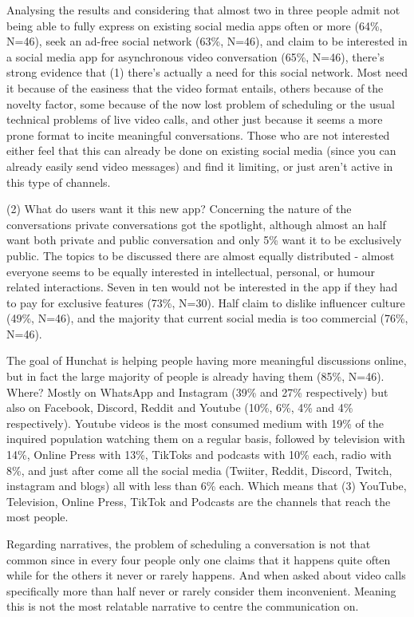 \documentclass[12pt]{article}
\begin{document}
Analysing the results and considering that almost two in three people admit not being able to fully express on existing social media apps often or more (64\%, N=46), seek an ad-free social network (63\%, N=46), and claim to be interested in a social media app for asynchronous video conversation (65\%, N=46), there's strong evidence that (1) there's actually a need for this social network. Most need it because of the easiness that the video format entails, others because of the novelty factor, some because of the now lost problem of scheduling or the usual technical problems of live video calls, and other just because it seems a more prone format to incite meaningful conversations. Those who are not interested either feel that this can already be done on existing social media (since you can already easily send video messages) and find it limiting, or just aren't active in this type of channels.

(2) What do users want it this new app? Concerning the nature of the conversations private conversations got the spotlight, although almost an half want both private and public conversation and only 5\% want it to be exclusively public. The topics to be discussed there are almost equally distributed - almost everyone seems to be equally interested in intellectual, personal, or humour related interactions. Seven in ten would not be interested in the app if they had to pay for exclusive features (73\%, N=30). Half claim to dislike influencer culture (49\%, N=46), and the majority that current social media is too commercial (76\%, N=46).

The goal of Hunchat is helping people having more meaningful discussions online, but in fact the large majority of people is already having them (85\%, N=46). Where? Mostly on WhatsApp and Instagram (39\% and 27\% respectively) but also on Facebook, Discord, Reddit and Youtube (10\%, 6\%, 4\% and 4\% respectively). Youtube videos is the most consumed medium with 19\% of the inquired population watching them on a regular basis, followed by television with 14\%, Online Press with 13\%, TikToks and podcasts with 10\% each, radio with 8\%, and just after come all the social media (Twiiter, Reddit, Discord, Twitch, instagram and blogs) all with less than 6\% each. Which means that (3) YouTube, Television, Online Press, TikTok and Podcasts are the channels that reach the most people.

Regarding narratives, the problem of scheduling a conversation is not that common since in every four people only one claims that it happens quite often while for the others it never or rarely happens. And when asked about video calls specifically more than half never or rarely consider them inconvenient. Meaning this is not the most relatable narrative to centre the communication on.
\end{document}
